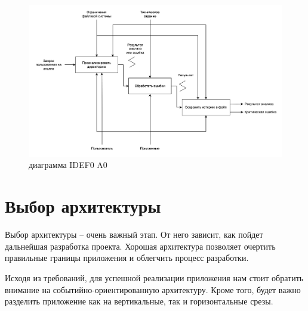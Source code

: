 \begin{figure}[ht] 
	\center
	\includegraphics [scale=0.15] {my_folder/images/IDEF0_A0.png}
	\caption{диаграмма IDEF0 A0} 
	\label{fig:idef0-A0}  
\end{figure}


\newpage\section{Выбор архитектуры} \label{ch1:sec22}
%

Выбор архитектуры – очень важный этап. От него зависит, как пойдет дальнейшая разработка проекта. Хорошая архитектура позволяет очертить правильные границы приложения и облегчить процесс разработки.

Исходя из требований, для успешной реализации приложения нам стоит обратить внимание на событийно-ориентированную архитектуру. Кроме того, будет важно разделить приложение как на вертикальные, так и горизонтальные срезы.

